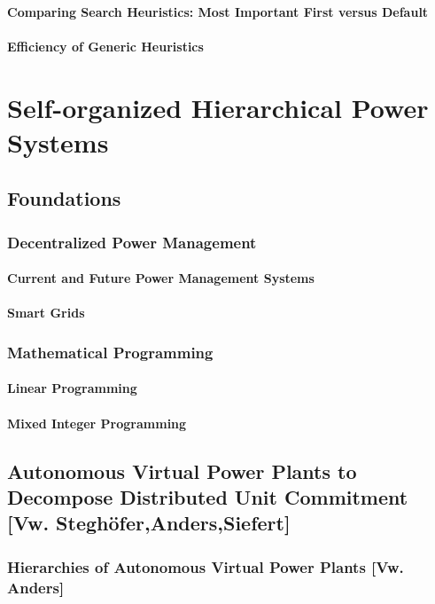 \documentclass[10pt,a4paper]{book}
\begin{document}
\subsection{Comparing Search Heuristics: Most Important First versus Default}

\subsection{Efficiency of Generic Heuristics}

\part{Self-organized Hierarchical Power Systems} 
\chapter{Foundations}
\section{Decentralized Power Management}
\subsection{Current and Future Power Management Systems}
\subsection{Smart Grids}

\section{Mathematical Programming}
\subsection{Linear Programming}
\subsection{Mixed Integer Programming}


\chapter{Autonomous Virtual Power Plants to Decompose Distributed Unit Commitment [Vw. Steghöfer,Anders,Siefert]}
\section{Hierarchies of Autonomous Virtual Power Plants [Vw. Anders]}
\end{document}
